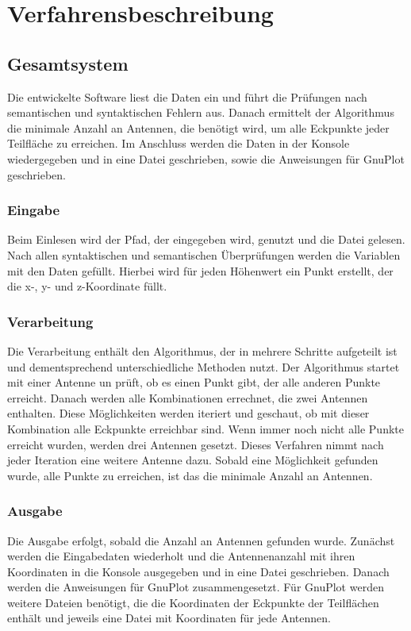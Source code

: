 \chapter{Verfahrensbeschreibung}\label{ch:verfahrensbeschreibung}

\section{Gesamtsystem}\label{sec:gesamtsystem}
Die entwickelte Software liest die Daten ein und führt die Prüfungen nach semantischen und syntaktischen Fehlern aus.
Danach ermittelt der Algorithmus die minimale Anzahl an Antennen, die benötigt wird, um alle Eckpunkte jeder Teilfläche zu erreichen.
Im Anschluss werden die Daten in der Konsole wiedergegeben und in eine Datei geschrieben, sowie die Anweisungen für GnuPlot geschrieben.

\subsection{Eingabe}\label{subsec:eingabe}
Beim Einlesen wird der Pfad, der eingegeben wird, genutzt und die Datei gelesen.
Nach allen syntaktischen und semantischen Überprüfungen werden die Variablen mit den Daten gefüllt.
Hierbei wird für jeden Höhenwert ein Punkt erstellt, der die x-, y- und z-Koordinate füllt.

\subsection{Verarbeitung}\label{subsec:verarbeitung}
Die Verarbeitung enthält den Algorithmus, der in mehrere Schritte aufgeteilt ist und dementsprechend unterschiedliche Methoden nutzt.
Der Algorithmus startet mit einer Antenne un prüft, ob es einen Punkt gibt, der alle anderen Punkte erreicht.
Danach werden alle Kombinationen errechnet, die zwei Antennen enthalten.
Diese Möglichkeiten werden iteriert und geschaut, ob mit dieser Kombination alle Eckpunkte erreichbar sind.
Wenn immer noch nicht alle Punkte erreicht wurden, werden drei Antennen gesetzt.
Dieses Verfahren nimmt nach jeder Iteration eine weitere Antenne dazu.
Sobald eine Möglichkeit gefunden wurde, alle Punkte zu erreichen, ist das die minimale Anzahl an Antennen.

\subsection{Ausgabe}\label{subsec:ausgabe}
Die Ausgabe erfolgt, sobald die Anzahl an Antennen gefunden wurde.
Zunächst werden die Eingabedaten wiederholt und die Antennenanzahl mit ihren Koordinaten in die Konsole ausgegeben und in eine Datei geschrieben.
Danach werden die Anweisungen für GnuPlot zusammengesetzt.
Für GnuPlot werden weitere Dateien benötigt, die die Koordinaten der Eckpunkte der Teilflächen enthält und jeweils eine Datei mit Koordinaten für jede Antennen.

